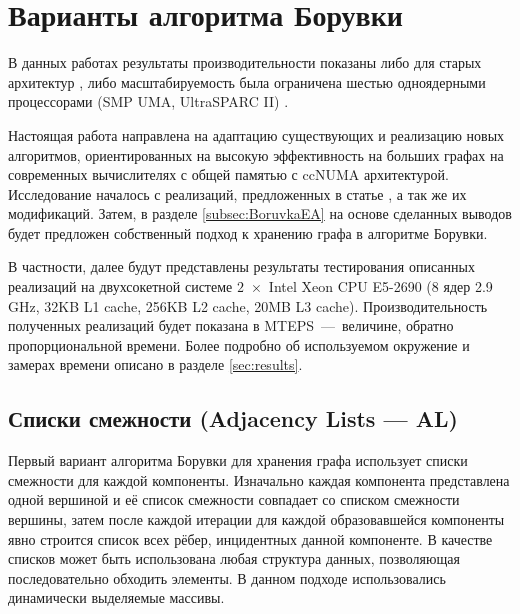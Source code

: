 \documentclass[a4paper,10pt]{extarticle}
\begin{document}

\section{Варианты алгоритма Борувки}
\label{sec:boruvkaIntro}
В данных работах \cite{dense-mst,boruvka-prima,boruvka-cm5} результаты производительности показаны либо для старых архитектур \cite{dense-mst,boruvka-cm5}, либо масштабируемость была ограничена шестью одноядерными процессорами (SMP  UMA, UltraSPARC II) \cite{boruvka-prima}.

Настоящая работа направлена на адаптацию существующих и реализацию новых алгоритмов, ориентированных на высокую эффективность на больших графах на современных вычислителях с общей памятью с ccNUMA архитектурой.
Исследование началось с реализаций, предложенных в статье \cite{boruvka-prima}, а так же их модификаций. Затем, в разделе \ref{subsec:BoruvkaEA} на основе сделанных выводов будет предложен собственный подход к хранению графа в алгоритме Борувки.

В частности, далее будут представлены результаты тестирования описанных реализаций на двухсокетной системе $2$~$\times$~Intel Xeon CPU E5-2690 (8 ядер 2.9 GHz, 32KB L1 cache, 256KB L2 cache, 20MB L3 cache). Производительность полученных реализаций будет показана в MTEPS~---~величине, обратно пропорциональной времени. Более подробно об используемом окружение и замерах времени описано в разделе \ref{sec:results}.

\subsection{Списки смежности (Adjacency Lists --- AL)}
\label{subsec:boruvkaAL}

Первый вариант алгоритма Борувки для хранения графа использует списки смежности для каждой компоненты. Изначально каждая компонента представлена одной вершиной и её список смежности совпадает со списком смежности вершины, затем после каждой итерации для каждой образовавшейся компоненты явно строится список всех рёбер, инцидентных данной компоненте.
В качестве списков может быть использована любая структура данных, позволяющая последовательно обходить элементы. В данном подходе использовались динамически выделяемые массивы.
\end{document}
